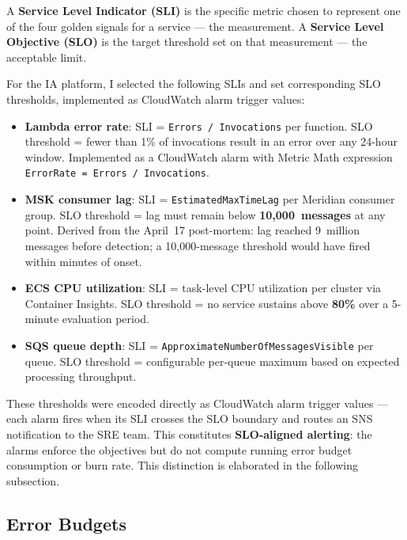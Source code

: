 A \textbf{Service Level Indicator (SLI)} is the specific metric chosen
to represent one of the four golden signals for a service --- the
measurement. A \textbf{Service Level Objective (SLO)} is the target
threshold set on that measurement --- the acceptable limit.

For the IA platform, I selected the following SLIs and set corresponding
SLO thresholds, implemented as CloudWatch alarm trigger values:

\begin{itemize}
    \item \textbf{Lambda error rate}: SLI = \texttt{Errors / Invocations}
          per function. SLO threshold = fewer than 1\% of invocations
          result in an error over any 24-hour window. Implemented as a
          CloudWatch alarm with Metric Math expression
          \texttt{ErrorRate = Errors / Invocations}.

    \item \textbf{MSK consumer lag}: SLI = \texttt{EstimatedMaxTimeLag}
          per Meridian consumer group. SLO threshold = lag must remain
          below \textbf{10,000~messages} at any point. Derived from the
          April~17 post-mortem: lag reached 9~million messages before
          detection; a 10,000-message threshold would have fired within
          minutes of onset.

    \item \textbf{ECS CPU utilization}: SLI = task-level CPU utilization
          per cluster via Container Insights. SLO threshold = no service
          sustains above \textbf{80\%} over a 5-minute evaluation period.

    \item \textbf{SQS queue depth}: SLI = \texttt{ApproximateNumberOfMessagesVisible}
          per queue. SLO threshold = configurable per-queue maximum based
          on expected processing throughput.
\end{itemize}

These thresholds were encoded directly as CloudWatch alarm trigger
values --- each alarm fires when its SLI crosses the SLO boundary and
routes an SNS notification to the SRE team. This constitutes
\textbf{SLO-aligned alerting}: the alarms enforce the objectives but do
not compute running error budget consumption or burn rate.
This distinction is elaborated in the following subsection.

\subsection{Error Budgets}

